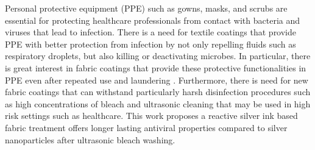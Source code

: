\documentclass[10pt,letterpaper]{article}
\begin{document}
Personal protective equipment (PPE) such as  gowns,  masks, and scrubs are essential for protecting healthcare professionals from contact with bacteria and viruses that lead to infection.
There is a need for textile coatings that provide PPE with better protection from infection 
by not only repelling fluids such as 
respiratory droplets, but 
also killing or deactivating microbes. In particular, there is great interest in fabric coatings that provide these protective functionalities in PPE even after repeated use and laundering \cite{Kraay:18,galante:2020,galante:2022}.
Furthermore, there is need for new fabric coatings that can withstand particularly harsh disinfection procedures such as high concentrations of bleach and ultrasonic cleaning that may be used in high%
risk settings such as healthcare. This work proposes a reactive silver ink based fabric treatment offers longer lasting antiviral properties compared to silver nanoparticles after ultrasonic bleach washing. 


\end{document}
